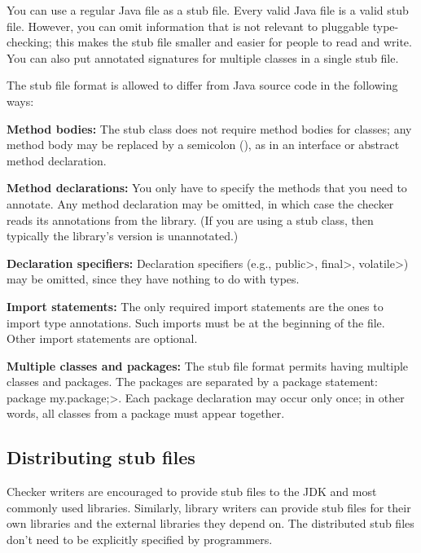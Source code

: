 You can use a regular Java file as a stub file.  Every valid Java file is a
valid stub file.  However, you can omit
information that is not relevant to pluggable type-checking; this makes the
stub file smaller and easier for people to read and write.  You can also
put annotated signatures for multiple classes in a single stub file.


The stub file format is allowed to differ from Java source code in the
following ways:
\begin{description}

\item{\textbf{Method bodies:}}
  The stub class does not require method bodies for classes; any method
  body may be replaced by a semicolon (\code{;}), as in an interface or
  abstract method declaration.

\item{\textbf{Method declarations:}}
  You only have to specify the methods that you need to annotate.
  Any method declaration may be omitted, in which case the checker reads
  its annotations from the library.  (If you are using a stub class, then
  typically the library's version is unannotated.)

\item{\textbf{Declaration specifiers:}}
  Declaration specifiers (e.g., \<public>, \<final>, \<volatile>)
  may be omitted, since they have nothing to do with types.

\item{\textbf{Import statements:}}
  The only required import statements are the ones to import type
  annotations.  Such imports must be at the beginning of the
  file.  Other import statements are optional.

\item{\textbf{Multiple classes and packages:}}
  The stub file format permits having multiple classes and packages.
  The packages are separated by a package statement:
  \<package my.package;>.  Each package declaration may occur only once; in
  other words, all classes from a package must appear together.

\end{description}

\subsection{Distributing stub files\label{stub-distribution}}

Checker writers are encouraged to provide stub files to the JDK and most
commonly used libraries.  Similarly, library writers can provide stub files
for their own libraries and the external libraries they depend on.  The
distributed stub files don't need to be explicitly specified by programmers.

